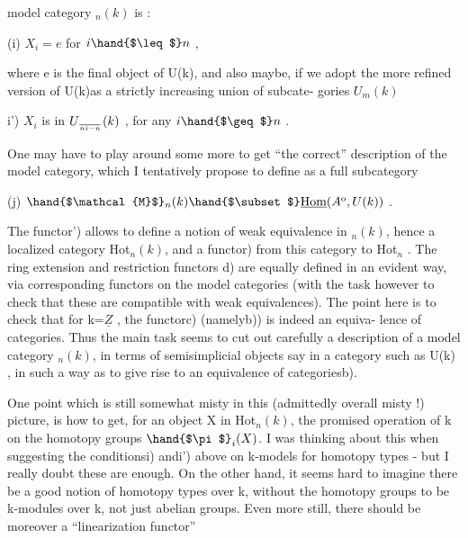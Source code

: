 
model category $_n(k)$ is :

(i) \qquad $X_i = e$ \quad for \quad $i \hand{$\leq$} n$ \quad ,

where e is the final object of U(k), and also maybe, if we adopt the
more refined version of U(k)\deleted{,}as a strictly increasing union of subcate-%
gories $U_m(k)$\hand{,}

\hand{(}i') \qquad $X_i$ is in $U_{\over{n}{i}-n}(k)$ , for any $i \hand{$\geq$} n$ \quad .

One may have to play around some more to get ``the correct'' description
of the model category,  which I tentatively propose to define  as
a  full subcategory

(j) \qquad $\hand{$\mathcal{M}$}_n(k) \hand{$\subset$} \underline{\mathrm{Hom}}(A^{\mathrm{o}}, U(k))$ \quad .

The functor\hand{(}') allows to define a notion of weak equivalence in
$_n(k)$, hence a localized category Hot$_n(k)$, and a functor\hand{(}) from
this category to Hot$_n$ . The ring extension and restriction functors
\hand{(}d) are equally defined in an evident way, via corresponding functors
on the model categories (with the task however to check that these
are compatible with weak equivalences). The  point here is to
check that for k=$\underline{Z}$ , the functor\hand{(}c) (namely\hand{(}b)) is indeed an equiva-%
lence of categories. Thus the main task seems to cut out carefully a
description of a model category $_n(k)$, in terms of semisimplicial
objects say in a category such as U(k) , in such a way as to give rise
to an equivalence of categories\hand{(}b).

One point which is still somewhat misty in this (admittedly overall
misty !) picture, is how to get, for an object X in Hot$_n(k)$, the
promised operation of k on the homotopy groups $\hand{$\pi$}_i(X)$. I was thinking
about this when suggesting the conditions\hand{(}i) and\hand{(}i') above on k-models
for homotopy types - but I really doubt these are enough. On the
other hand, it seems hard to imagine  there be a good notion
of homotopy types over k, without the homotopy groups to be k-modules
over k, not just abelian groups. Even more still, there should be
moreover a ``linearization functor''


